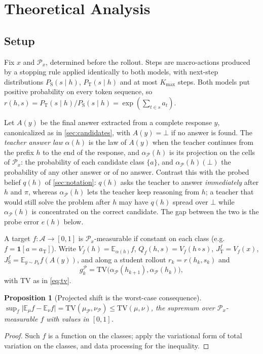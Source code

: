 \documentclass[11pt]{article}
\newtheorem{proposition}{Proposition}
\theoremstyle{definition}
\theoremstyle{remark}
\newcommand{\PT}{P_{\mathrm{T}}}
\newcommand{\PS}{P_{\mathrm{S}}}
\newcommand{\JT}{J_{\mathrm{T}}}
\newcommand{\JS}{J_{\mathrm{S}}}
\newcommand{\aT}{a_{\mathrm{T}}}
\newcommand{\TV}{\mathrm{TV}}
\newcommand{\E}{\mathbb{E}}
\newcommand{\cA}{\mathcal{A}}
\newcommand{\other}{\bot}
\begin{document}
\section{Theoretical Analysis}
\label{sec:theory}

\subsection{Setup}
Fix $x$ and $\mathcal P_x$, determined before the rollout. Steps are macro-actions produced by a stopping rule applied identically to both models, with next-step distributions $\PS(s\mid h)$, $\PT(s\mid h)$ and at most $K_{\max}$ steps. Both models put positive probability on every token sequence, so $r(h,s)=\PT(s\mid h)/\PS(s\mid h)=\exp(\sum_{t\in s}a_t)$.

Let $A(y)$ be the final answer extracted from a complete response $y$, canonicalized as in \cref{sec:candidates}, with $A(y)=\other$ if no answer is found. The \emph{teacher answer law} $\alpha(h)$ is the law of $A(y)$ when the teacher continues from the prefix $h$ to the end of the response, and $\alpha_{\mathcal P}(h)$ is its projection on the cells of $\mathcal P_x$: the probability of each candidate class $\{a\}$, and $\alpha_{\mathcal P}(h)(\other)$ the probability of any other answer or of no answer. Contrast this with the probed belief $q(h)$ of \cref{sec:notation}: $q(h)$ asks the teacher to answer \emph{immediately} after $h$ and $\pi$, whereas $\alpha_{\mathcal P}(h)$ lets the teacher keep reasoning from $h$; a teacher that would still solve the problem after $h$ may have $q(h)$ spread over $\other$ while $\alpha_{\mathcal P}(h)$ is concentrated on the correct candidate. The gap between the two is the probe error $e(h)$ below.

A target $f:\cA\to[0,1]$ is $\mathcal P_x$-measurable if constant on each class (e.g.\ $f=\mathbf 1[a=\aT]$). Write $V_f(h)=\E_{\alpha(h)}f$, $Q_f(h,s)=V_f(h\circ s)$, $\JT^f=V_f(x)$, $\JS^f=\E_{y\sim\PS}f(A(y))$, and along a student rollout $r_k=r(h_k,s_k)$ and
\[
g^{\mathcal P}_k=\TV\big(\alpha_{\mathcal P}(h_{k+1}),\alpha_{\mathcal P}(h_k)\big),
\]
with $\TV$ as in \cref{eq:tv}.

\begin{proposition}[Projected shift is the worst-case consequence]
\label{prop:targetfree}
$\sup_f\lvert\E_\mu f-\E_\nu f\rvert=\TV(\mu_{\mathcal P},\nu_{\mathcal P})\le\TV(\mu,\nu)$, the supremum over $\mathcal P_x$-measurable $f$ with values in $[0,1]$.
\end{proposition}
\begin{proof}
Such $f$ is a function on the classes; apply the variational form of total variation on the classes, and data processing for the inequality.
\end{proof}
\end{document}
